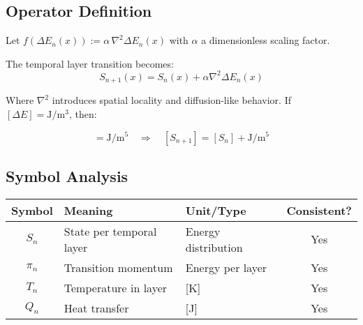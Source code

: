 
\subsection*{Operator Definition}

Let $f(\Delta E_n(x)) := \alpha \, \nabla^2 \Delta E_n(x)$ with $\alpha$ a dimensionless scaling factor.

The temporal layer transition becomes:
\begin{equation*}
S_{n+1}(x) = S_n(x) + \alpha \nabla^2 \Delta E_n(x)
\end{equation*}

Where $\nabla^2$ introduces spatial locality and diffusion-like behavior. If $[\Delta E] = \mathrm{J/m^3}$, then:

\begin{equation*}
[f(\Delta E)] = \mathrm{J/m^5}
\quad \Rightarrow \quad [S_{n+1}] = [S_n] + \mathrm{J/m^5}
\end{equation*}

\subsection*{Symbol Analysis}

\begin{tabular}{|c|l|l|c|}
\hline
Symbol & Meaning & Unit/Type & Consistent? \\
\hline
$S_n$ & State per temporal layer & Energy distribution & Yes \\
$\pi_n$ & Transition momentum & Energy per layer & Yes \\
$T_n$ & Temperature in layer & [K] & Yes \\
$Q_n$ & Heat transfer & [J] & Yes \\
\hline
\end{tabular}
